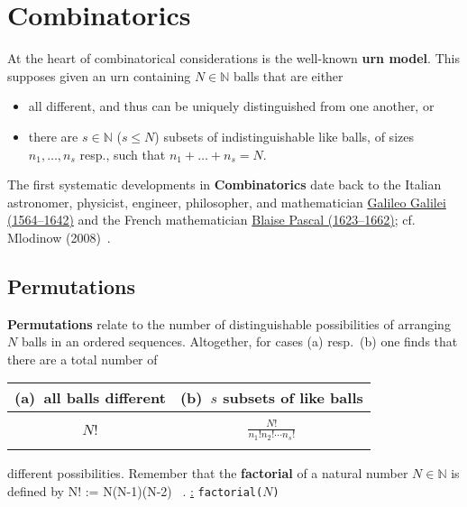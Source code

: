 \section[Combinatorics]{Combinatorics}
At the heart of combinatorical considerations is the well-known 
\textbf{urn model}. This supposes given an urn containing $N \in 
\mathbb{N}$ balls that are either
%
\begin{itemize}
\item[(a)] all different, and thus can 
be uniquely distinguished from one another, or
\item[(b)] there are $s \in 
\mathbb{N}$ ($s \leq N$) subsets of indistinguishable
like balls, of sizes $n_{1},\ldots,n_{s}$ resp., such that 
$n_{1}+\ldots+n_{s}=N$.
\end{itemize}
%
The first systematic developments in \textbf{Combinatorics} date
back to the Italian astronomer, physicist, engineer, philosopher,
and mathematician 
\href{http://www-history.mcs.st-and.ac.uk/Biographies/Galileo.html}{Galileo Galilei (1564--1642)} and the French mathematician
\href{http://www-history.mcs.st-and.ac.uk/Biographies/Pascal.html}{Blaise Pascal (1623--1662)}; cf. Mlodinow 
(2008)~.

\subsection{Permutations}
\textbf{Permutations} relate to the number of distinguishable 
possibilities of arranging $N$ balls in an ordered sequences. 
Altogether, for cases (a) resp.\ (b) one finds that there are a 
total number of

%
\begin{center}
    \begin{tabular}[h!]{c|c}
    (a)~all balls different & (b)~$s$ subsets of like balls \\
    \hline
     & \\
    $N!$ & $\displaystyle \frac{N!}{n_{1}!n_{2}!\cdots n_{s}!}$
    \\
     & \\
    \end{tabular}
\end{center}
%
different possibilities. Remember that the \textbf{factorial} of a 
natural number $N \in \mathbb{N}$ is defined by
%
\be
N! := N\times(N-1)\times(N-2)\times\cdots{}  
 \ .
\ee
%
\underline{\R:} \texttt{factorial($N$)}

